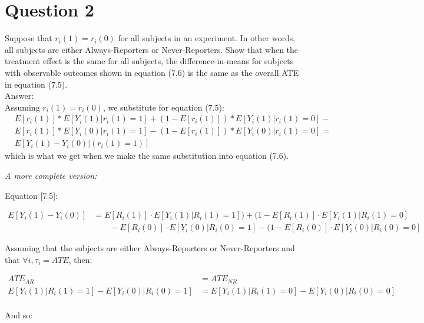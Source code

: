 \documentclass[11pt,notitlepage]{article}\usepackage[]{graphicx}\usepackage[]{color}
\begin{document}
\section*{Question 2}
Suppose that $r_i(1) = r_i(0)$ for all subjects in an experiment. In other words, all subjects are either Always-Reporters or Never-Reporters. Show that when the treatment effect is the same for all subjects, the difference-in-means for subjects with observable outcomes shown in equation (7.6) is the same as the overall ATE in equation (7.5). \\
Answer:\\
Assuming $r_i(1)=r_i(0)$, we substitute for equation (7.5):
\begin{align*}
& E[r_i(1)] * E[Y_i(1)|r_i(1)=1] + (1-E[r_i(1)])*E[Y_i(1)|r_i(1)=0] - \\
& E[r_i(1)] * E[Y_i(0)|r_i(1)=1]-(1-E[r_i(1)])*E[Y_i(0)|r_i(1)=0] =\\
& E[Y_i(1)-Y_i(0)|(r_i(1)=1)]
\end{align*}
which is what we get when we make the same substitution into equation (7.6).

\textit{A more complete version:}

Equation [7.5]:

\begin{align*}
E[Y_{i}(1)-Y_{i}(0)] &= E[R_{i}(1)]\cdot E[Y_{i}(1) \vert R_{i}(1) =1]) + (1-E[R_{i}(1)] \cdot E[Y_{i}(1) \vert R_{i}(1) =0]\\
& \qquad -  E[R_{i}(0)]\cdot E[Y_{i}(0) \vert R_{i}(0) =1] - (1-E[R_{i}(0)] \cdot E[Y_{i}(0) \vert R_{i}(0) =0]
\end{align*}

Assuming that the subjects are either Always-Reporters or Never-Reporters and that $\forall i, \tau_{i}=ATE$, then:

\begin{align*}
ATE_{AR} &= ATE_{NR}\\
E[Y_{i}(1) \vert R_{i}(1) =1] - E[Y_{i}(0) \vert R_{i}(0) =1] &= E[Y_{i}(1) \vert R_{i}(1) =0] - E[Y_{i}(0) \vert R_{i}(0) =0]\\
\end{align*}

And so:
\end{document}
